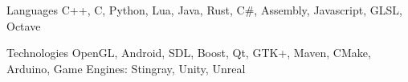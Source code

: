 


\begin{cvskills}


\cvskill
{Languages} %
{C++, C, Python, Lua, Java, Rust, C\#, Assembly, Javascript, GLSL, Octave } %


\cvskill
{Technologies}
    {OpenGL, Android, SDL, Boost, Qt, GTK+, Maven, CMake, Arduino, Game Engines: Stingray, Unity, Unreal}



\end{cvskills}
